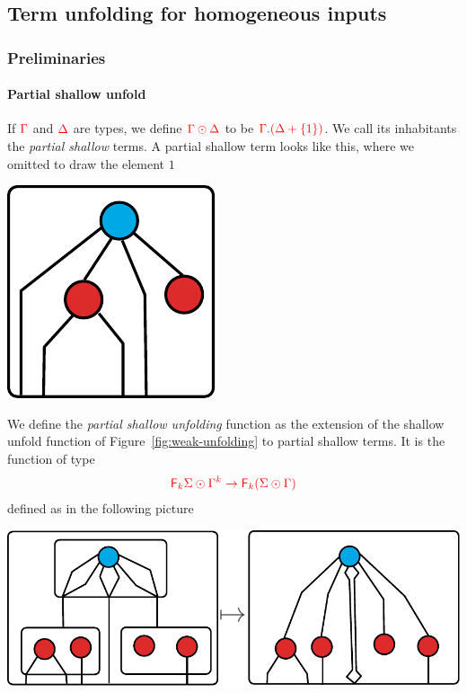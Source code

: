 
\subsection{Term unfolding for homogeneous inputs}
\label{sec:homo-unfold}

\subsubsection{Preliminaries}

\paragraph*{Partial shallow unfold}
 If ${\color{red}{\Gamma}}$ and ${\color{red}{\Delta}}$ are types, we define ${\color{red}{\Gamma\odot\Delta}}$ to be ${\color{red}{\Gamma.(\Delta+\{1\})}}$. We call its inhabitants the \emph{partial shallow} terms. A partial shallow term looks like this, where we omitted to draw the element $1$ 
\begin{center}
\includegraphics[scale=.4]{pictures/partial-shallow-term.pdf}
\end{center}
We define the \emph{partial shallow unfolding} function as the extension  of the shallow unfold function of Figure~\ref{fig:weak-unfolding} to partial shallow terms. It is the function of type 
\begin{align*}
{\color{red}{{{\color{red}{\mathsf F_{k}}}\Sigma}\odot{\Gamma^k} \to {\color{red}{\mathsf F_{k}}}({\Sigma}\odot{\Gamma})}} 
\end{align*}
defined as in the following picture
 \begin{center}
\includegraphics[scale=.4]{pictures/partial-shallow-unfold.pdf}
 \end{center}
